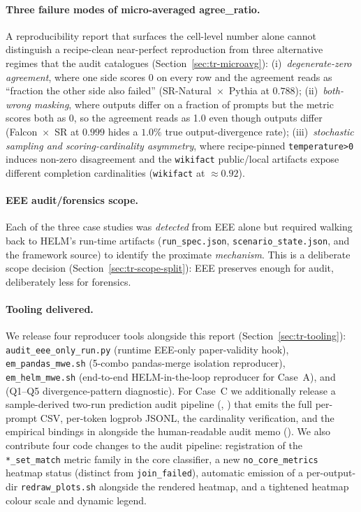 \documentclass[11pt]{article}
\begin{document}
\paragraph{Three failure modes of micro-averaged agree\_ratio.}
A reproducibility report that surfaces the cell-level number alone
  cannot distinguish a recipe-clean near-perfect reproduction from
  three alternative regimes that the audit catalogues
  (Section~\ref{sec:tr-microavg}):
  (i)~\emph{degenerate-zero agreement}, where one side scores 0 on
  every row and the agreement reads as ``fraction the other side also
  failed'' (SR-Natural~$\times$~Pythia at $0.788$);
  (ii)~\emph{both-wrong masking}, where outputs differ on a fraction of
  prompts but the metric scores both as 0, so the agreement reads as
  1.0 even though outputs differ (Falcon~$\times$~SR at $0.999$ hides
  a $1.0\%$ true output-divergence rate);
  (iii)~\emph{stochastic sampling and scoring-cardinality asymmetry},
  where recipe-pinned \texttt{temperature>0} induces non-zero
  disagreement and the \texttt{wikifact} public/local artifacts expose
  different completion cardinalities
  (\texttt{wikifact} at $\approx 0.92$).

\paragraph{EEE audit/forensics scope.}
Each of the three case studies was \emph{detected} from EEE alone but
  required walking back to HELM's run-time artifacts
  (\texttt{run\_spec.json}, \texttt{scenario\_state.json}, and the
  framework source) to identify the proximate \emph{mechanism}.
This is a deliberate scope decision (Section~\ref{sec:tr-scope-split}):
  EEE preserves enough for audit, deliberately less for forensics.

\paragraph{Tooling delivered.}
We release four reproducer tools alongside this report
  (Section~\ref{sec:tr-tooling}):
  \texttt{audit\_eee\_only\_run.py} (runtime EEE-only paper-validity
  hook),
  \texttt{em\_pandas\_mwe.sh} (5-combo pandas-merge isolation
  reproducer),
  \texttt{em\_helm\_mwe.sh} (end-to-end HELM-in-the-loop reproducer
  for Case~A),
  and  (Q1--Q5
  divergence-pattern diagnostic).
For Case~C we additionally release a sample-derived two-run
  prediction audit pipeline
  (,
  ) that emits the
  full per-prompt CSV, per-token logprob JSONL, the cardinality
  verification, and the empirical bindings in
   alongside the human-readable
  audit memo
  ().
We also contribute four code changes to the audit pipeline:
  registration of the \texttt{*\_set\_match} metric family in the core
  classifier, a new \texttt{no\_core\_metrics} heatmap status
  (distinct from \texttt{join\_failed}), automatic emission of a
  per-output-dir \texttt{redraw\_plots.sh} alongside the rendered
  heatmap, and a tightened heatmap colour scale and dynamic legend.
\end{document}
